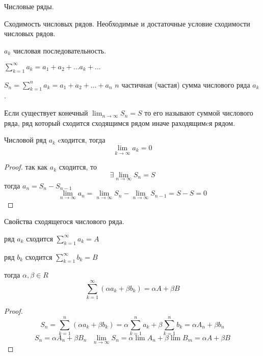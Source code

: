 \begin{title}
  Числовые ряды.
\end{title}

\begin{title}[\Large]
  Сходимость числовых рядов. Необходимые и достаточные условие сходимости
  числовых рядов.
\end{title}

  $a_k$ числовая последовательность.

  $\sum_{k=1}^{\infty} a_k = a_1 + a_2 + \ldots a_k + \ldots$

  $S_n = \sum_{k=1}^n a_k = a_1 + a_2 + \ldots + a_n$ $n$ частичная (частая)
сумма числового ряда $a_k$.

  Если существует конечный $\lim_{n \to \infty} S_n = S$ то его называют суммой
числового ряда, ряд который сходится сходящимся рядом иначе раходящимcя рядом.

\begin{block}
  Числовой ряд $a_k$ cходится, тогда
  $$
  \lim_{k \to \infty} a_k = 0
  $$
\end{block}

\begin{proof}
  так как $a_k$ сходится, то
  $$
  \exists \lim_{n \to \infty} S_n = S  $$
  тогда $a_n = S_n - S_{n-1}$
  $$
  \lim_{n \to \infty} a_n = \lim_{n \to \infty} S_n -
  \lim_{n \to \infty} S_{n-1} = S - S = 0
  $$
\end{proof}

\begin{title}[\Large]
  Свойства сходящегося числового ряда.
\end{title}

\begin{theorem}
  ряд $a_k$ сходится $\sum_{k=1}^{\infty} a_k = A$

  ряд $b_k$ сходится $\sum_{k=1}^{\infty} b_k = B$

  тогда $\alpha, \beta \in R$
  $$
  \sum_{k=1}^{\infty} (\alpha a_k + \beta b_k) = \alpha A + \beta B
  $$
\end{theorem}

\begin{proof}
  $$
  S_n = \sum_{k=1}^n (\alpha a_k + \beta b_k) =
  \alpha \sum_{k=1}^n a_k + \beta \sum_{k=1}^n b_k = \alpha A_n + \beta b_n
  $$
  $$
  S_n = \alpha A_n + \beta B_n ~~~
  \lim_{n \to \infty} S_n = \alpha \lim A_n + \beta \lim B_m =
  \alpha A + \beta B
  $$
\end{proof}

